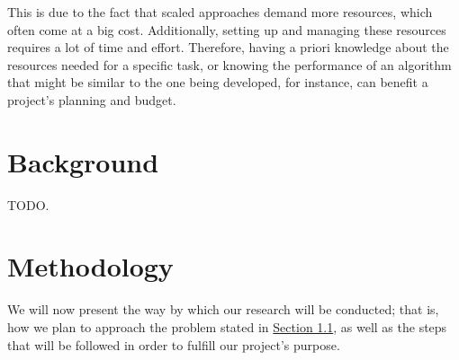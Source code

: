 \documentclass[a4paper,11pt]{article}
\begin{document}
\medskip

\par This is due to the fact that scaled approaches demand more resources, which often come at a big cost. Additionally, setting up and managing these resources requires a lot of time and effort. Therefore, having a priori knowledge about the resources needed for a specific task, or knowing the performance of an algorithm that might be similar to the one being developed, for instance, can benefit a project's planning and budget.





\section{Background} \label{background}

\par TODO.





\section{Methodology} \label{methodology}

\par We will now present the way by which our research will be conducted; that is, how we plan to approach the problem stated in \hyperref[problem-statement]{Section 1.1}, as well as the steps that will be followed in order to fulfill our project's purpose.
\end{document}

